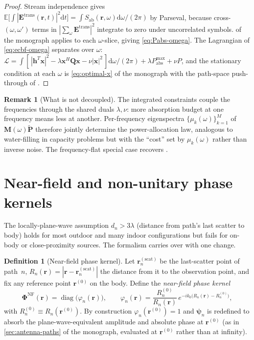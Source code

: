 \documentclass[11pt,a4paper]{article}
\theoremstyle{definition}
\newtheorem{definition}[definition]{Definition}
\newtheorem{remark}[remark]{Remark}
\newcommand{\rr}{\mathbf{r}}
\newcommand{\EE}{\mathbf{E}}
\newcommand{\Sab}{S_{\mathrm{ab}}}
\newcommand{\diff}{\mathrm{d}}
\newcommand{\Phimat}{\mathbf{\Phi}}            %
\newcommand{\Mmat}{\mathbf{M}}                 %
\newcommand{\Qmat}{\mathbf{Q}}                 %
\newcommand{\Pmat}{\tilde{\mathbf{P}}}         %
\newcommand{\xx}{\mathbf{x}}
\newcommand{\hh}{\mathbf{h}}
\newcommand{\psin}{\bm{\psi}_n}
\begin{document}
\begin{proof}
Stream independence gives
$\mathbb E\bigl[\int|\EE^\mathrm{trans}(\rr,t)|^2\diff t\bigr]
=\int\Sab(\rr,\omega)\diff\omega/(2\pi)$ by Parseval, because cross-$(\omega,\omega')$
terms in $|\sum_\omega\EE^\mathrm{trans}|^2$ integrate to zero under uncorrelated
symbols.   of the monograph applies to each
$\omega$-slice, giving \eqref{eq:Pabs-omega}.  The Lagrangian of
\eqref{eq:ecbf-omega} separates over $\omega$:
$\mathcal L=\int[\,|\hh^T\xx|^2-\lambda\xx^H\Qmat\xx-\nu|\xx|^2\,]\diff\omega/(2\pi)
+\lambda P_\mathrm{abs}^{\max}+\nu P$, and the stationary condition at each
$\omega$ is \cref{eq:optimal-x} of the monograph with the path-space
push-through of .
\end{proof}

\begin{remark}[What is not decoupled]\label{rem:omega-coupling}
The integrated constraints couple the frequencies through the shared
duals $\lambda,\nu$: more absorption budget at one frequency means less at
another.  Per-frequency eigenspectra
$\{\mu_k(\omega)\}_{k=1}^M$ of $\Mmat(\omega)\Pmat$ therefore jointly
determine the power-allocation law, analogous to water-filling in
capacity problems but with the ``cost'' set by $\mu_k(\omega)$ rather than
inverse noise.  The frequency-flat special case recovers
.
\end{remark}

\section{Near-field and non-unitary phase kernels}\label{sec:nearfield}

The locally-plane-wave assumption $d_n>3\lambda$ (distance from path's
last scatter to body) holds for most outdoor and many indoor
configurations but fails for on-body or close-proximity sources.  The
formalism carries over with one change.

\begin{definition}[Near-field phase kernel]\label{def:NF}
Let $\rr_n^{(\mathrm{scat})}$ be the last-scatter point of path~$n$,
$R_n(\rr)=|\rr-\rr_n^{(\mathrm{scat})}|$ the distance from it to the
observation point, and fix any reference point $\rr^{(0)}$ on the body.
Define the \emph{near-field phase kernel}
\begin{equation}\label{eq:PhiNF}
  \Phimat^{\mathrm{NF}}(\rr)=\operatorname{diag}\bigl(\varphi_n(\rr)\bigr),
  \qquad
  \varphi_n(\rr)=\frac{R_n^{(0)}}{R_n(\rr)}\,
  e^{-ik_0\bigl(R_n(\rr)-R_n^{(0)}\bigr)},
\end{equation}
with $R_n^{(0)}\equiv R_n(\rr^{(0)})$.  By construction $\varphi_n(\rr^{(0)})=1$
and $\psin$ is redefined to absorb the plane-wave-equivalent amplitude and
absolute phase at $\rr^{(0)}$ (as in \cref{sec:antenna-paths} of the
monograph, evaluated at $\rr^{(0)}$ rather than at infinity).
\end{definition}
\end{document}
